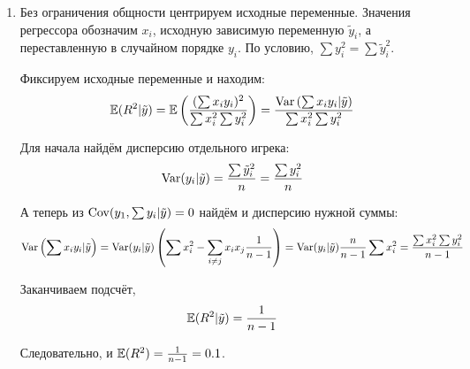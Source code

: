 \begin{enumerate}
\item Без ограничения общности центрируем исходные переменные.
Значения регрессора обозначим $x_i$, исходную зависимую переменную $\tilde{y}_i$,
а переставленную в случайном порядке $y_i$.
По условию, $\sum y_i^2 = \sum \tilde{y}_i^2$.

Фиксируем исходные переменные и находим:
\[
\mathbb{E}(R^2 | \tilde{y}) = \mathbb{E}\left( \frac{(\sum x_i y_i )^2}{\sum x_i^2 \sum y_i^2}  \right) =
\frac{\operatorname{Var}\left(\sum x_i y_i | \tilde{y}\right)}{\sum x_i^2 \sum y_i^2}
\]

Для начала найдём дисперсию отдельного игрека:
\[
\operatorname{Var}(y_i | \tilde{y}) = \frac{\sum \tilde{y}_i^2}{n} = \frac{\sum y_i^2}{n}
\]

А теперь из $\operatorname{Cov}(y_1, \sum y_i | \tilde{y}) =0$ найдём и дисперсию нужной суммы:
\[
\operatorname{Var}\left(\sum x_i y_i | \tilde{y}\right) =
\operatorname{Var}(y_i | \tilde{y}) \left(  \sum x_i^2 - \sum_{i\neq j} x_i x_j \frac{1}{n-1}  \right) =
\operatorname{Var}(y_i | \tilde{y}) \frac{n}{n-1} \sum x_i^2 = \frac{\sum x_i^2 \sum y_i^2 }{n-1}
\]

Заканчиваем подсчёт,
\[
\mathbb{E}(R^2 | \tilde{y}) = \frac{1}{n-1}
\]

Следовательно, и $\mathbb{E}(R^2) = \frac{1}{n-1} = 0.1$.

\end{enumerate}
